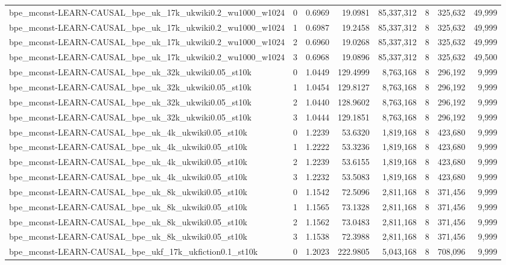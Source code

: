 \begin{tabular}{lrrrrrrr}
bpe\_mconst-LEARN-CAUSAL\_bpe\_uk\_17k\_ukwiki0.2\_wu1000\_w1024 & 0 & 0.6969 & 19.0981 & 85,337,312 & 8 & 325,632 & 49,999 \\
bpe\_mconst-LEARN-CAUSAL\_bpe\_uk\_17k\_ukwiki0.2\_wu1000\_w1024 & 1 & 0.6987 & 19.2458 & 85,337,312 & 8 & 325,632 & 49,999 \\
bpe\_mconst-LEARN-CAUSAL\_bpe\_uk\_17k\_ukwiki0.2\_wu1000\_w1024 & 2 & 0.6960 & 19.0268 & 85,337,312 & 8 & 325,632 & 49,999 \\
bpe\_mconst-LEARN-CAUSAL\_bpe\_uk\_17k\_ukwiki0.2\_wu1000\_w1024 & 3 & 0.6968 & 19.0896 & 85,337,312 & 8 & 325,632 & 49,500 \\
bpe\_mconst-LEARN-CAUSAL\_bpe\_uk\_32k\_ukwiki0.05\_st10k & 0 & 1.0449 & 129.4999 & 8,763,168 & 8 & 296,192 & 9,999 \\
bpe\_mconst-LEARN-CAUSAL\_bpe\_uk\_32k\_ukwiki0.05\_st10k & 1 & 1.0454 & 129.8127 & 8,763,168 & 8 & 296,192 & 9,999 \\
bpe\_mconst-LEARN-CAUSAL\_bpe\_uk\_32k\_ukwiki0.05\_st10k & 2 & 1.0440 & 128.9602 & 8,763,168 & 8 & 296,192 & 9,999 \\
bpe\_mconst-LEARN-CAUSAL\_bpe\_uk\_32k\_ukwiki0.05\_st10k & 3 & 1.0444 & 129.1851 & 8,763,168 & 8 & 296,192 & 9,999 \\
bpe\_mconst-LEARN-CAUSAL\_bpe\_uk\_4k\_ukwiki0.05\_st10k & 0 & 1.2239 & 53.6320 & 1,819,168 & 8 & 423,680 & 9,999 \\
bpe\_mconst-LEARN-CAUSAL\_bpe\_uk\_4k\_ukwiki0.05\_st10k & 1 & 1.2222 & 53.3236 & 1,819,168 & 8 & 423,680 & 9,999 \\
bpe\_mconst-LEARN-CAUSAL\_bpe\_uk\_4k\_ukwiki0.05\_st10k & 2 & 1.2239 & 53.6155 & 1,819,168 & 8 & 423,680 & 9,999 \\
bpe\_mconst-LEARN-CAUSAL\_bpe\_uk\_4k\_ukwiki0.05\_st10k & 3 & 1.2232 & 53.5083 & 1,819,168 & 8 & 423,680 & 9,999 \\
bpe\_mconst-LEARN-CAUSAL\_bpe\_uk\_8k\_ukwiki0.05\_st10k & 0 & 1.1542 & 72.5096 & 2,811,168 & 8 & 371,456 & 9,999 \\
bpe\_mconst-LEARN-CAUSAL\_bpe\_uk\_8k\_ukwiki0.05\_st10k & 1 & 1.1565 & 73.1328 & 2,811,168 & 8 & 371,456 & 9,999 \\
bpe\_mconst-LEARN-CAUSAL\_bpe\_uk\_8k\_ukwiki0.05\_st10k & 2 & 1.1562 & 73.0483 & 2,811,168 & 8 & 371,456 & 9,999 \\
bpe\_mconst-LEARN-CAUSAL\_bpe\_uk\_8k\_ukwiki0.05\_st10k & 3 & 1.1538 & 72.3988 & 2,811,168 & 8 & 371,456 & 9,999 \\
bpe\_mconst-LEARN-CAUSAL\_bpe\_ukf\_17k\_ukfiction0.1\_st10k & 0 & 1.2023 & 222.9805 & 5,043,168 & 8 & 708,096 & 9,999 \\

\end{tabular}
